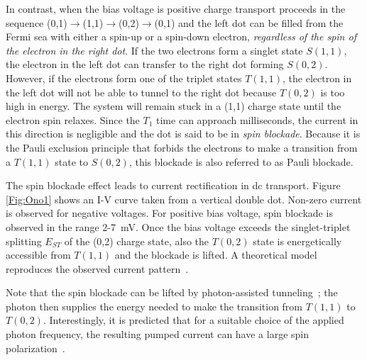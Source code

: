 \documentclass[12pt,aps,nofootinbib]{revtex4-1}
\begin{document}
In contrast, when the bias voltage is positive charge transport
proceeds in the sequence
(0,1)$\rightarrow$(1,1)$\rightarrow$(0,2)$\rightarrow$(0,1) and
the left dot can be filled from the Fermi sea with either a
spin-up or a spin-down electron, \textit{regardless of the spin of
the electron in the right dot}. If the two electrons form a
singlet state $S(1,1)$, the electron in the left dot can transfer
to the right dot forming $S(0,2)$. However, if the electrons form
one of the triplet states $T(1,1)$, the electron in the left dot
will not be able to tunnel to the right dot because $T(0,2)$ is
too high in energy. The system will remain stuck in a (1,1) charge
state until the electron spin relaxes. Since the $T_1$ time can
approach milliseconds, the current in this direction is negligible
and the dot is said to be in \textit{spin blockade}. Because it is
the Pauli exclusion principle that forbids the electrons to make a
transition from a $T(1,1)$ state to $S(0,2)$, this blockade is
also referred to as Pauli blockade.

The spin blockade effect leads to current rectification in dc
transport. Figure \ref{Fig:Ono1} shows an I-V curve taken from a
vertical double dot. Non-zero current is observed for negative
voltages. For positive bias voltage, spin blockade is observed in
the range 2-7~mV. Once the bias voltage exceeds the
singlet-triplet splitting $E_{ST}$ of the (0,2) charge state, also
the $T(0,2)$ state is energetically accessible from $T(1,1)$ and
the blockade is lifted. A theoretical model reproduces the observed current pattern~\cite{FranssonPRB2006}.

Note that the spin blockade can be lifted by photon-assisted tunneling~\cite{SanchezPSS2006}; the photon then supplies the energy needed to make the transition from $T(1,1)$ to $T(0,2)$. Interestingly, it is predicted that for a suitable choice of the applied photon frequency, the resulting pumped current can have a large spin polarization~\cite{CotaPRL2005,SanchezPRB2006}.
\end{document}
